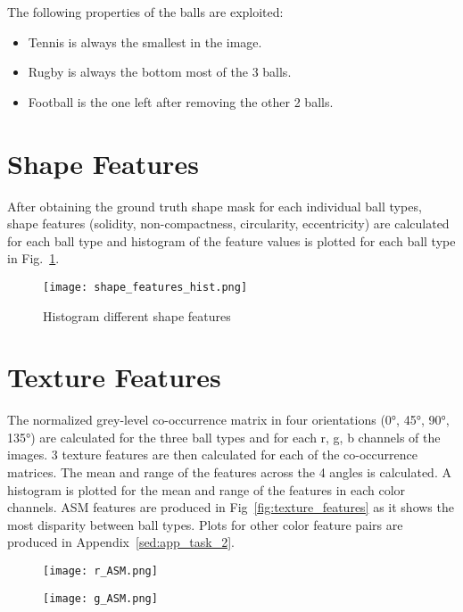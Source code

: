 \documentclass{report}
\begin{document}
The following properties of the balls are exploited:

\begin{itemize}
    \item Tennis is always the smallest in the image.
    \item Rugby is always the bottom most of the 3 balls.
    \item Football is the one left after removing the other 2 balls.
\end{itemize}

\section{Shape Features}

After obtaining the ground truth shape mask for each individual ball types, shape features (solidity, non-compactness, circularity, eccentricity) are calculated for each ball type and histogram of the feature values is plotted for each ball type in Fig.~\ref{fig:shape_features_hist}.

\begin{figure}[ht]
    \centering
    \texttt{[image: shape\_features\_hist.png]}
    \caption{Histogram different shape features}
    \label{fig:shape_features_hist}
\end{figure}

\section{Texture Features}

The normalized grey-level co-occurrence matrix in four orientations (0°, 45°, 90°, 135°) are calculated for the three ball types and for each r, g, b channels of the images. 3 texture features are then calculated for each of the co-occurrence matrices. The mean and range of the features across the 4 angles is calculated. A histogram is plotted for the mean and range of the features in each color channels. ASM features are produced in Fig~\ref{fig:texture_features} as it shows the most disparity between ball types. Plots for other color feature pairs are produced in Appendix~\ref{sed:app_task_2}.

\begin{figure}[ht]
    \centering
    \texttt{[image: r\_ASM.png]}
    \label{fig:r_ASM}
\end{figure}

\begin{figure}[ht]
    \centering
    \texttt{[image: g\_ASM.png]}
    \label{fig:g_ASM}
\end{figure}
\end{document}

